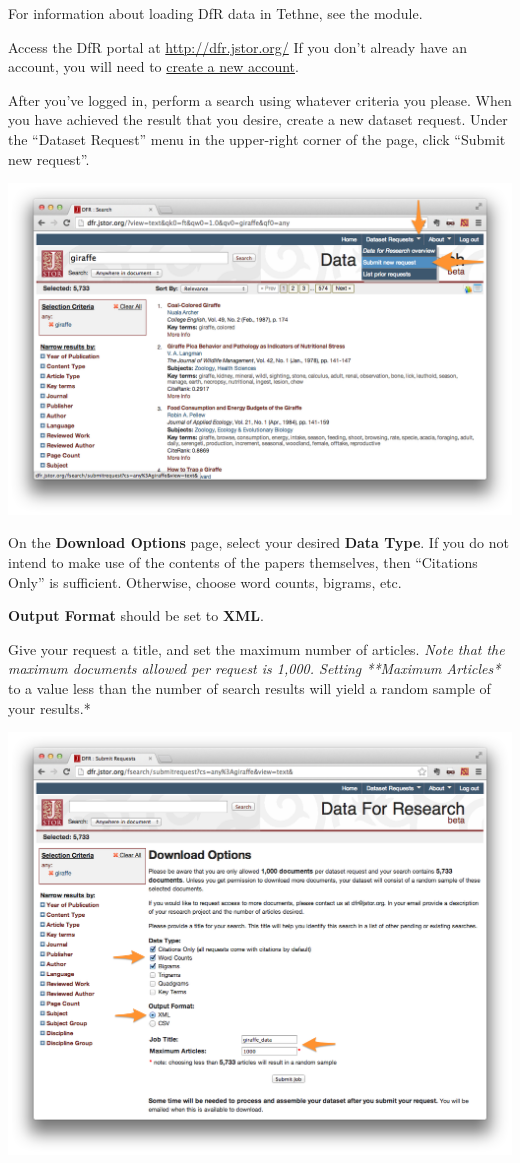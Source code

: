 \documentclass[letterpaper,10pt,english]{sphinxmanual}
\begin{document}
For information about loading DfR data in Tethne, see the {\hyperref[tethne.readers.dfr:module-tethne.readers.dfr]{}} module.

Access the DfR portal at
\href{http://dfr.jstor.org/}{http://dfr.jstor.org/} If you don't already have an account,
you will need to \href{http://dfr.jstor.org/accounts/register/}{create a new account}.

After you've logged in, perform a search using whatever criteria you please. When you have
achieved the result that you desire, create a new dataset request. Under the ``Dataset
Request'' menu in the upper-right corner of the page, click ``Submit new request''.

\includegraphics[width=0.600\linewidth]{getting.5.png}

On the \textbf{Download Options} page, select your desired \textbf{Data Type}. If you do not intend
to make use of the contents of the papers themselves, then ``Citations Only'' is sufficient.
Otherwise, choose word counts, bigrams, etc.

\textbf{Output Format} should be set to \textbf{XML}.

Give your request a title, and set the maximum number of articles. \emph{Note that the maximum
documents allowed per request is 1,000. Setting **Maximum Articles*} to a value less than
the number of search results will yield a random sample of your results.*

\includegraphics[width=0.600\linewidth]{getting.6.png}
\end{document}
